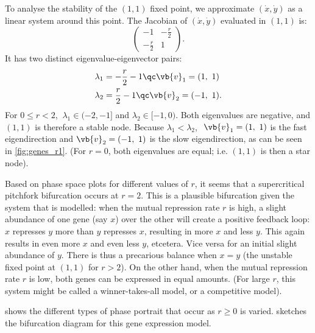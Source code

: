 To analyse the stability of the $(1,1)$ fixed point, we approximate $(\dot{x}, \dot{y})$ as a linear system around this point. The Jacobian of $(\dot{x}, \dot{y})$ evaluated in $(1,1)$ is:
\[
\begin{pmatrix}
-1 & -\frac{r}{2}  \\
-\frac{r}{2} & 1
\end{pmatrix}.
\]
It has two distinct eigenvalue-eigenvector pairs:
%
\begin{align*}
\lambda_1 &= -\frac{r}{2} - 1   \qc \vb{v}_1 = (1,\ 1)  \\
\lambda_2 &= \frac{r}{2} - 1    \qc \vb{v}_2 = (-1,\ 1).
\end{align*}
%
For $0 \leq r < 2$, $\ \lambda_1 \in (-2, -1]$ and $\lambda_2 \in [-1, 0)$. Both eigenvalues are negative, and $(1,1)$ is therefore a stable node. Because $\lambda_1 < \lambda_2$, $\ \vb{v}_1 = (1,\ 1)$ is the fast eigendirection and $\vb{v}_2 = (-1,\ 1)$ is the slow eigendirection, as can be seen in \cref{fig:genes_r1}. (For $r = 0$, both eigenvalues are equal; i.e. $(1,1)$ is then a star node).


Based on phase space plots for different values of $r$, it seems that a supercritical pitchfork bifurcation occurs at $r = 2$. This is a plausible bifurcation given the system that is modelled: when the mutual repression rate $r$ is high, a slight abundance of one gene (say $x$) over the other will create a positive feedback loop: $x$ represses $y$ more than $y$ represses $x$, resulting in more $x$ and less $y$. This again results in even more $x$ and even less $y$, etcetera. Vice versa for an initial slight abundance of $y$. There is thus a precarious balance when $x = y$ (the unstable fixed point at $(1,1)$ for $r > 2$). On the other hand, when the mutual repression rate $r$ is low, both genes can be expressed in equal amounts. (For large $r$, this system might be called a winner-takes-all model, or a competitive model).

 shows the different types of phase portrait that occur as $r \ge 0$ is varied.  sketches the bifurcation diagram for this gene expression model.

\begin{figure}
\label{fig:gene_phases}
\end{figure}

\begin{figure}
\label{fig:gene_bifurc}
\end{figure}

